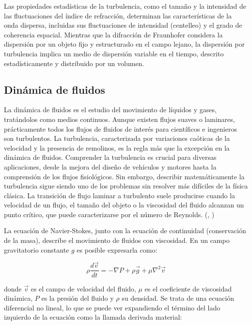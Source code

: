 Las propiedades estadísticas de la turbulencia, como el tamaño y la intensidad de las fluctuaciones del índice de refracción, determinan las características de la onda dispersa, incluidas sus fluctuaciones de intensidad (centelleo) y el grado de coherencia espacial. Mientras que la difracción de Fraunhofer considera la dispersión por un objeto fijo y estructurado en el campo lejano, la dispersión por turbulencia implica un medio de dispersión variable en el tiempo, descrito estadísticamente y distribuido por un volumen.

\subsection{Dinámica de fluidos}

La dinámica de fluidos es el estudio del movimiento de líquidos y gases, tratándolos como medios continuos. Aunque existen flujos suaves o laminares, prácticamente todos los flujos de fluidos de interés para científicos e ingenieros son turbulentos. La turbulencia, caracterizada por variaciones caóticas de la velocidad y la presencia de remolinos, es la regla más que la excepción en la dinámica de fluidos. Comprender la turbulencia es crucial para diversas aplicaciones, desde la mejora del diseño de vehículos y motores hasta la comprensión de los flujos fisiológicos. Sin embargo, describir matemáticamente la turbulencia sigue siendo uno de los problemas sin resolver más difíciles de la física clásica. La transición de flujo laminar a turbulento suele producirse cuando la velocidad de un flujo, el tamaño del objeto o la viscosidad del fluido alcanzan un punto crítico, que puede caracterizarse por el número de Reynolds. (\cite{mcdonough_lectures_2009}, \cite{symon_capitulo_1980})

La ecuación de Navier-Stokes, junto con la ecuación de continuidad (conservación de la masa), describe el movimiento de fluidos con viscosidad. En un campo gravitatorio constante $g$ es posible expresarla como:

\begin{equation}
    \rho \frac{d\vec{v}}{dt} = -\nabla P + \rho\vec{g} + \mu \nabla^2 \vec{v}
\end{equation}

donde $\vec{v}$ es el campo de velocidad del fluido, $\mu$ es el coeficiente de viscosidad dinámica, $P$ es la presión del fluido y $\rho$ su densidad. Se trata de una ecuación diferencial no lineal, lo que se puede ver expandiendo el término del lado izquierdo de la ecuación como la llamada derivada material: 

